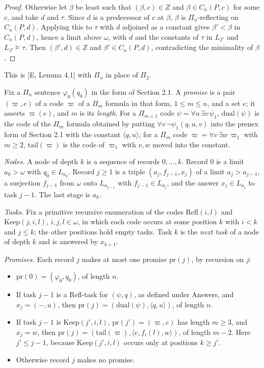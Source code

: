 \documentclass[11pt]{article}
\begin{document}
\begin{proof}
Otherwise let $\beta$ be least such that $(\beta, c) \in Z$ and $\beta \in C_n(P,c)$ for some $c$, and take $d$ and
$\tau$. Since $d$ is a predecessor of $c$ at $\beta$, $\beta$ is $\Pi_n$-reflecting on $C_n(P,d)$. Applying this to
$\tau$ with $d$ adjoined as a constant gives $\beta' < \beta$ in $C_n(P,d)$, hence a limit above $\omega$, with $d$ and
the constants of $\tau$ in $L_{\beta'}$ and $L_{\beta'} \models \tau$. Then $(\beta', d) \in Z$ and $\beta' \in
C_n(P,d)$, contradicting the minimality of $\beta$.
\end{proof}

This is [E, Lemma 4.1] with $\Pi_n$ in place of $\Pi_2$.

\begin{statement} Fix a $\Pi_n$ sentence $\varphi_0(q_0)$ in the form of
Section 2.1. A \emph{promise} is a pair $(\varpi, e)$ of a code $\varpi$ of a $\Pi_m$ formula in that form, $1 \le m \le n$,
and a set $e$; it asserts $\varpi(e)$, and $m$ is its \emph{length}. For a $\Pi_{m+1}$ code $\psi = \forall u\, \exists
v\, \psi_1$, $\mathrm{dual}(\psi)$ is the code of the $\Pi_m$ formula obtained by putting $\forall v\,
\neg\psi_1(q,u,v)$ into the prenex form of Section 2.1 with the constant $\langle q, u\rangle$; for a $\Pi_m$
code $\varpi = \forall v\, \exists w\, \varpi_1$ with $m \ge 2$, $\mathrm{tail}(\varpi)$ is the code of $\varpi_1$ with $v, w$
moved into the constant.

\emph{Nodes.} A node of depth $k$ is a sequence of records $0, \dots, k$. Record 0 is a limit $a_0 > \omega$ with
$q_0 \in L_{a_0}$. Record $j \ge 1$ is a triple $(a_j, f_{j-1}, x_j)$ of a limit $a_j > a_{j-1}$, a surjection
$f_{j-1}$ from $\omega$ onto $L_{a_{j-1}}$ with $f_{j-1} \in L_{a_j}$, and the answer $x_j \in L_{a_j}$ to task $j-1$.
The last stage is $a_k$.

\emph{Tasks.} Fix a primitive recursive enumeration of the codes $\mathrm{Refl}(i,l)$ and $\mathrm{Keep}(j,i,l)$, $i, j,
l \in \omega$, in which each code occurs at some position $k$ with $i < k$ and $j \le k$; the other positions hold
empty tasks. Task $k$ is the \emph{next task} of a node of depth $k$ and is answered by $x_{k+1}$.

\emph{Promises.} Each record $j$ makes at most one promise $\mathrm{pr}(j)$, by recursion on $j$:
\begin{itemize}
\item[(P0)] $\mathrm{pr}(0) = (\varphi_0, q_0)$, of length $n$.
\item[(P1)] If task $j-1$ is a Refl-task for $(\psi, q)$, as defined under Answers, and $x_j = (-, u)$, then $\mathrm{pr}(j) =
  (\mathrm{dual}(\psi), \langle q, u\rangle)$, of length $n$.
\item[(P2)] If task $j-1$ is $\mathrm{Keep}(j', i, l)$, $\mathrm{pr}(j') = (\varpi, e)$ has length $m \ge 3$, and $x_j =
  w$, then $\mathrm{pr}(j) = (\mathrm{tail}(\varpi), \langle e, f_i(l), w\rangle)$, of length $m - 2$. Here $j' \le j-1$,
  because $\mathrm{Keep}(j',i,l)$ occurs only at positions $k \ge j'$.
\item[(P3)] Otherwise record $j$ makes no promise.
\end{itemize}


\end{statement}
\end{document}
